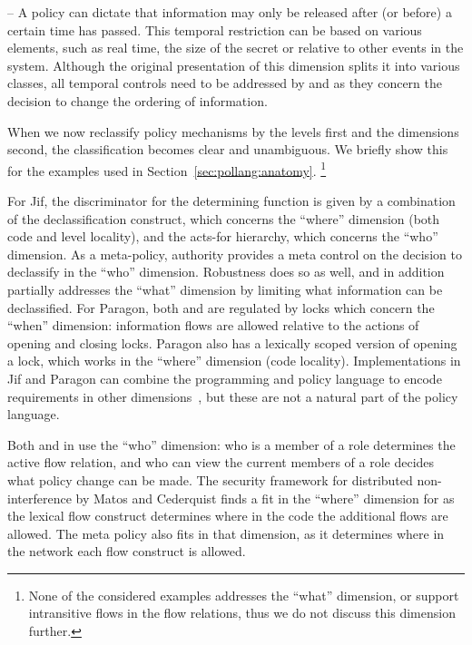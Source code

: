  --
A policy can dictate that information may only be released after (or before) a certain time has passed.
This temporal restriction can be based on various elements, such as real time, the size of the secret or relative to other events in the system.
Although the original presentation of this dimension splits it into various classes, all temporal controls need to be addressed by \dynamicpol{} and \metapol{} as they concern the decision to change the ordering of information.



When we now reclassify policy mechanisms by the levels first and the dimensions second, 
the classification becomes clear and unambiguous.
We briefly show this for the examples used in Section~\ref{sec:pollang:anatomy}.
\footnote{None of the considered examples addresses the ``what'' dimension, or 
support intransitive flows in the flow relations, thus we do not discuss this dimension further.}

For Jif, the discriminator for the determining function \dynamicpol{} is given by a combination
of the declassification construct, which concerns the ``where'' dimension (both code and level locality), and
the acts-for hierarchy, which concerns the ``who'' dimension.
As a meta-policy, authority provides a meta control on the decision to
declassify in the ``who'' dimension.
Robustness does so as well, and in addition partially addresses the ``what'' dimension by limiting what information can be declassified.
For Paragon, both \dynamicpol{} and \metapol{} are regulated by locks which concern the ``when'' 
dimension: information flows are allowed relative to the actions of opening and closing locks.
Paragon also has a lexically scoped version of opening a lock, which works in the ``where'' dimension
(code locality).
Implementations in Jif and Paragon can combine the programming and policy language to encode
requirements in other dimensions~\cite{Askarov:Sabelfeld:ESORICS2005,Paragon,paragontut},
but these are not a natural part of the policy language.

Both \dynamicpol{} and \metapol{} in \Rx{} use the ``who'' dimension: who is a member of a role
determines the active flow relation, and who can view the current members of a role decides what
policy change can be made.
The security framework for distributed non-interference by Matos and Cederquist finds a fit in
the ``where'' dimension for \dynamicpol{} as the lexical flow construct determines where in the code the additional
flows are allowed. The meta policy also fits in that dimension, as it determines where in the network each flow construct is allowed.

